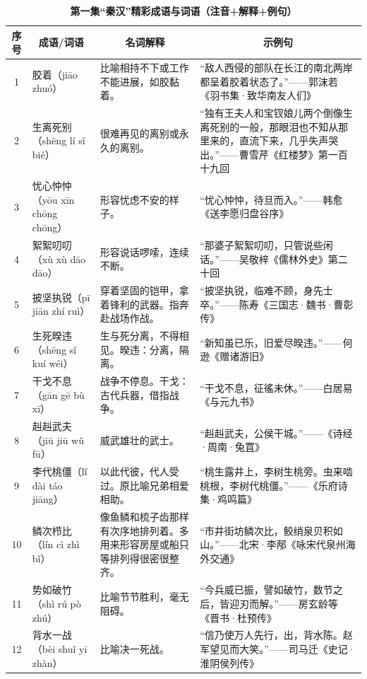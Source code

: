 \begin{table}[htbp]
\centering
\small
\renewcommand{\arraystretch}{1.2}
\caption{\textbf{第一集“秦汉”精彩成语与词语（注音+解释+例句）}}
\begin{tabularx}{\textwidth}{@{}c p{2.6cm} p{2.6cm} X@{}}
\toprule
\multicolumn{1}{c}{\textbf{序号}} & \multicolumn{1}{c}{\textbf{成语/词语}} & \multicolumn{1}{c}{\textbf{名词解释}} & \multicolumn{1}{c}{\textbf{示例句}} \\
\midrule
1 & 胶着（jiāo zhuó） & 比喻相持不下或工作不能进展，如胶黏着。 & “敌人西侵的部队在长江的南北两岸都呈着胶着状态了。”——郭沫若《羽书集·致华南友人们》 \\
2 & 生离死别（shēng lí sǐ bié） & 很难再见的离别或永久的离别。 & “独有王夫人和宝钗娘儿两个倒像生离死别的一般，那眼泪也不知从那里来的，直流下来，几乎失声哭出。”——曹雪芹《红楼梦》第一百十九回 \\
3 & 忧心忡忡（yōu xīn chōng chōng） & 形容忧虑不安的样子。 & “忧心忡忡，待旦而入。”——韩愈《送李愿归盘谷序》 \\
4 & 絮絮叨叨（xù xù dāo dāo） & 形容说话啰嗦，连续不断。 & “那婆子絮絮叨叨，只管说些闲话。”——吴敬梓《儒林外史》第二十回 \\
5 & 披坚执锐（pī jiān zhí ruì） & 穿着坚固的铠甲，拿着锋利的武器。指奔赴战场作战。 & “披坚执锐，临难不顾，身先士卒。”——陈寿《三国志·魏书·曹彰传》 \\
6 & 生死暌违（shēng sǐ kuí wéi） & 生与死分离，不得相见。暌违：分离，隔离。 & “新知虽已乐，旧爱尽暌违。”——何逊《赠诸游旧》 \\
7 & 干戈不息（gān gē bù xī） & 战争不停息。干戈：古代兵器，借指战争。 & “干戈不息，征徭未休。”——白居易《与元九书》 \\
8 & 赳赳武夫（jiū jiū wǔ fū） & 威武雄壮的武士。 & “赳赳武夫，公侯干城。”——《诗经·周南·兔罝》 \\
9 & 李代桃僵（lǐ dài táo jiāng） & 以此代彼，代人受过。原比喻兄弟相爱相助。 & “桃生露井上，李树生桃旁。虫来啮桃根，李树代桃僵。”——《乐府诗集·鸡鸣篇》 \\
10 & 鳞次栉比（lín cì zhì bǐ） & 像鱼鳞和梳子齿那样有次序地排列着。多用来形容房屋或船只等排列得很密很整齐。 & “市井街坊鳞次比，鲛绡泉贝积如山。”——北宋·李邴《咏宋代泉州海外交通》 \\
11 & 势如破竹（shì rú pò zhú） & 比喻节节胜利，毫无阻碍。 & “今兵威已振，譬如破竹，数节之后，皆迎刃而解。”——房玄龄等《晋书·杜预传》 \\
12 & 背水一战（bèi shuǐ yī zhàn） & 比喻决一死战。 & “信乃使万人先行，出，背水陈。赵军望见而大笑。”——司马迁《史记·淮阴侯列传》 \\

\end{tabularx}
\end{table}
